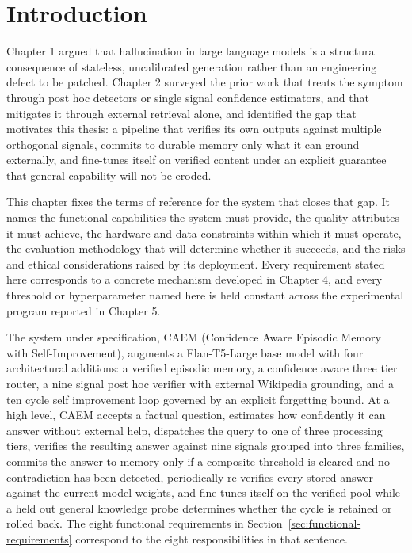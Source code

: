 
\section{Introduction}
\label{sec:ch3-intro}

Chapter 1 argued that hallucination in large language models is a structural consequence of stateless, uncalibrated generation rather than an engineering defect to be patched. Chapter 2 surveyed the prior work that treats the symptom through post hoc detectors or single signal confidence estimators, and that mitigates it through external retrieval alone, and identified the gap that motivates this thesis: a pipeline that verifies its own outputs against multiple orthogonal signals, commits to durable memory only what it can ground externally, and fine-tunes itself on verified content under an explicit guarantee that general capability will not be eroded.

This chapter fixes the terms of reference for the system that closes that gap. It names the functional capabilities the system must provide, the quality attributes it must achieve, the hardware and data constraints within which it must operate, the evaluation methodology that will determine whether it succeeds, and the risks and ethical considerations raised by its deployment. Every requirement stated here corresponds to a concrete mechanism developed in Chapter 4, and every threshold or hyperparameter named here is held constant across the experimental program reported in Chapter 5.

The system under specification, CAEM (Confidence Aware Episodic Memory with Self-Improvement), augments a Flan-T5-Large base model with four architectural additions: a verified episodic memory, a confidence aware three tier router, a nine signal post hoc verifier with external Wikipedia grounding, and a ten cycle self improvement loop governed by an explicit forgetting bound. At a high level, CAEM accepts a factual question, estimates how confidently it can answer without external help, dispatches the query to one of three processing tiers, verifies the resulting answer against nine signals grouped into three families, commits the answer to memory only if a composite threshold is cleared and no contradiction has been detected, periodically re-verifies every stored answer against the current model weights, and fine-tunes itself on the verified pool while a held out general knowledge probe determines whether the cycle is retained or rolled back. The eight functional requirements in Section~\ref{sec:functional-requirements} correspond to the eight responsibilities in that sentence.

